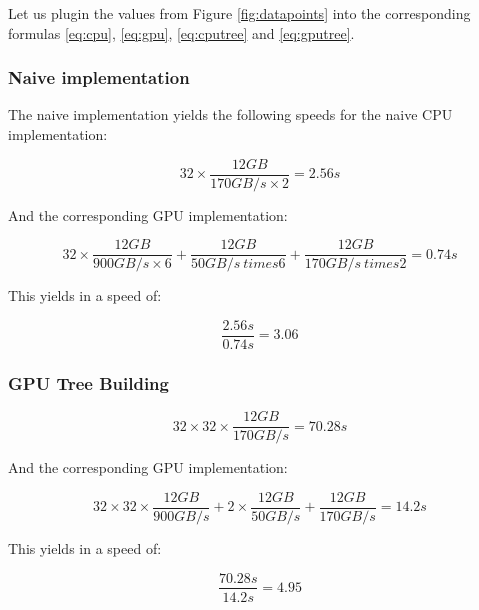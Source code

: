 \documentclass[]{article}
\begin{document}
Let us plugin the values from Figure \ref{fig:datapoints} into the corresponding formulas \ref{eq:cpu}, \ref{eq:gpu}, \ref{eq:cputree} and \ref{eq:gputree}.

\subsubsection{Naive implementation}
The naive implementation yields the following speeds for the naive CPU  implementation:

\begin{center}
	\begin{equation}
		32 \times \frac{ 12 GB }{170 GB/s \times 2} = 2.56s
	\end{equation}
\end{center}

And the corresponding GPU implementation:
\begin{center}
	\begin{equation}
		32 \times \frac{12 GB}{900 GB/s \times 6} + \frac{12 GB}{50 GB/s \ times 6}  + \frac{12 GB}{170 GB/s \ times 2} = 0.74s
	\end{equation}
\end{center}

This yields in a speed of:
\begin{center}
	\begin{equation}
		\frac{2.56s}{0.74s} = 3.06
	\end{equation}
\end{center}


\subsubsection{GPU Tree Building}

\begin{center}
	\begin{equation}
		32 \times 32 \times \frac{ 12 GB }{170 GB/s} = 70.28s
	\end{equation}
\end{center}

And the corresponding GPU implementation:
\begin{center}
	\begin{equation}
		32 \times 32 \times \frac{12 GB}{900 GB/s} + 2 \times \frac{12 GB}{50 GB/s}  + \frac{12 GB}{170 GB/s} = 14.2s
	\end{equation}
\end{center}

This yields in a speed of:
\begin{center}
	\begin{equation}
		\frac{70.28s}{14.2s} = 4.95
	\end{equation}
\end{center}
\end{document}
